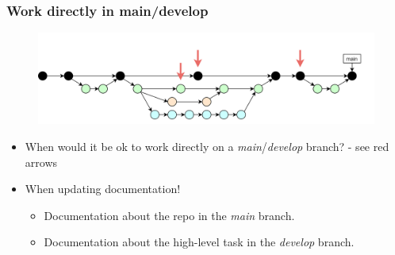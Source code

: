 \documentclass[aspectratio=169]{beamer}
\begin{document}
\begin{frame}
	\frametitle{Work directly in main/develop}

	\vspace{-.5cm}
	\begin{minipage}[t][5cm][t]{\textwidth}
		\begin{figure}
			\centering
			\includegraphics[width=\textwidth]{./img/dime-gitflow-network-workdirectly.png}
		\end{figure}
	\end{minipage}

	\vspace{-.5cm}
	\begin{minipage}[t][5cm][t]{\textwidth}
		\begin{itemize}
			\setlength\itemsep{.5em}
			\item <1->When would it be ok to work
			directly on a \textit{main}/\textit{develop} branch?
			- see red arrows
			\item <2->When updating documentation!
			\begin{itemize}
				\setlength\itemsep{.5em}
				\item <2->Documentation about the repo
				in the \textit{main} branch.
				\item <2->Documentation about the high-level task
				in the \textit{develop} branch.
			\end{itemize}
		\end{itemize}
	\end{minipage}
\end{frame}
\end{document}
